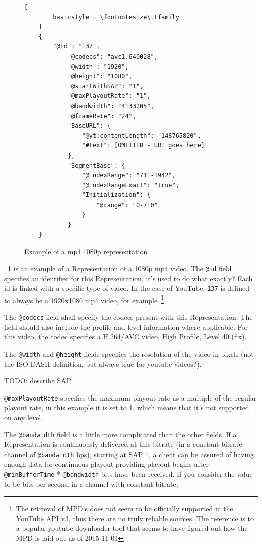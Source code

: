 \begin{figure}
    \centering
    \begin{lstlisting}[
        basicstyle = \footnotesize\ttfamily
    ]
    {
        "@id": "137",
            "@codecs": "avc1.640028",
            "@width": "1920",
            "@height": "1080",
            "@startWithSAP": "1",
            "@maxPlayoutRate": "1",
            "@bandwidth": "4133205",
            "@frameRate": "24",
            "BaseURL": {
                "@yt:contentLength": "148765820",
                "#text": [OMITTED - URI goes here]
            },
            "SegmentBase": {
                "@indexRange": "711-1942",
                "@indexRangeExact": "true",
                "Initialization": {
                    "@range": "0-710"
                }
            }
    }
    \end{lstlisting}
    \caption{Example of a mp4 1080p representation}
    \label{fig:dash-1080p-representation}
\end{figure}

~\ref{fig:dash-1080p-representation} is an example of a Representation of a 1080p mp4 video. The \texttt{@id}
field specifies an identifier for this Representation, it's used to do
what exactly? Each id is linked with a specific type of video. In the case of
YouTube, \texttt{137} is defined to always be a 1920x1080 mp4 video, for
example~\cite[line 303]{youtube-dl:youtube.py}\footnote{The retrieval of MPD's
does not seem to be officially supported in the YouTube API v3, thus there are
no truly reliable sources. The reference is to a popular youtube downloader tool
that seems to have figured out how the MPD is laid out as of 2015-11-01}

The \texttt{@codecs} field shall specify the codecs present with this
Representation. The field should also include the profile and level
information where applicable. For this video, the codec specifies a
H.264/AVC video, High Profile, Level 40 (fix).

The \texttt{@width} and \texttt{@height} fields specifies the resolution of the video in
pixels (not the ISO DASH definition, but always true for youtube
videos?).

TODO: describe SAP

\texttt{@maxPlayoutRate} specifies the maximum playout rate as a multiple of the
regular playout rate, in this example it is set to 1, which means that
it's not supported on any level.

The \texttt{@bandwidth} field is a little more complicated than the other fields.
If a Representation is continuously delivered at this bitrate (in a
constant bitrate channel of \texttt{@bandwidth} bps), starting at SAP 1, a client
can be assured of having enough data for continuous playout providing
playout begins after \texttt{@minBufferTime} * \texttt{@bandwidth} bits have been
received. If you consider the value to be bits per second in a channel
with constant bitrate,

